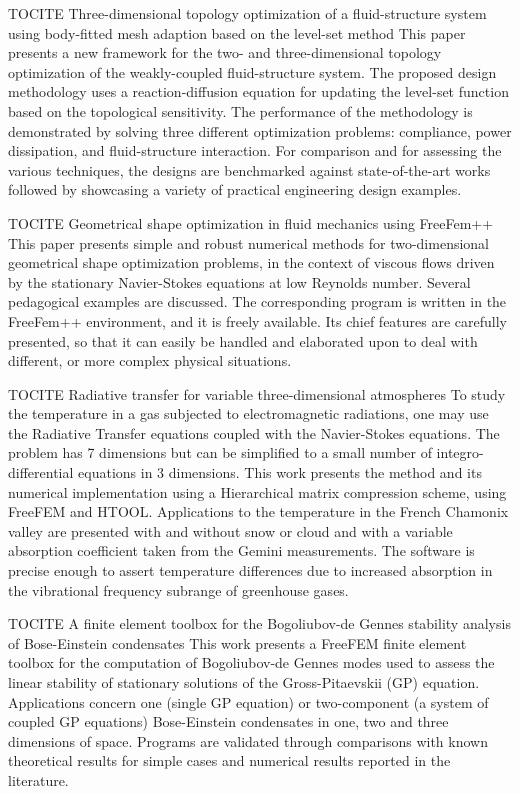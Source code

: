 \begin{description}
{TOCITE Three-dimensional topology optimization of a fluid-structure system using body-fitted mesh adaption based on the level-set method} This paper presents a new framework for the two- and three-dimensional topology optimization of the weakly-coupled fluid-structure system. The proposed design methodology uses a reaction-diffusion equation for updating the level-set function based on the topological sensitivity. The performance of the methodology is demonstrated by solving three different optimization problems: compliance, power dissipation, and fluid-structure interaction. For comparison and for assessing the various techniques, the designs are benchmarked against state-of-the-art works followed by showcasing a variety of practical engineering design examples.

{TOCITE Geometrical shape optimization in fluid mechanics using FreeFem++} This paper presents simple and robust numerical methods for two-dimensional geometrical shape optimization problems, in the context of viscous flows driven by the stationary Navier-Stokes equations at low Reynolds number. Several pedagogical examples are discussed. The corresponding program is written in the FreeFem++ environment, and it is freely available. Its chief features are carefully presented, so that it can easily be handled and elaborated upon to deal with different, or more complex physical situations.

{TOCITE Radiative transfer for variable three-dimensional atmospheres} To study the temperature in a gas subjected to electromagnetic radiations, one may use the Radiative Transfer equations coupled with the Navier-Stokes equations. The problem has 7 dimensions but can be simplified to a small number of integro-differential equations in 3 dimensions. This work presents the method and its numerical implementation using a Hierarchical matrix compression scheme, using FreeFEM and HTOOL. Applications to the temperature in the French Chamonix valley are presented with and without snow or cloud and with a variable absorption coefficient taken from the Gemini measurements. The software is precise enough to assert temperature differences due to increased absorption in the vibrational frequency subrange of greenhouse gases.

{TOCITE A finite element toolbox for the Bogoliubov-de Gennes stability analysis of Bose-Einstein condensates} This work presents a FreeFEM finite element toolbox for the computation of Bogoliubov-de Gennes modes used to assess the linear stability of stationary solutions of the Gross-Pitaevskii (GP) equation. Applications concern one (single GP equation) or two-component (a system of coupled GP equations) Bose-Einstein condensates in one, two and three dimensions of space. Programs are validated through comparisons with known theoretical results for simple cases and numerical results reported in the literature.
\end{description}

